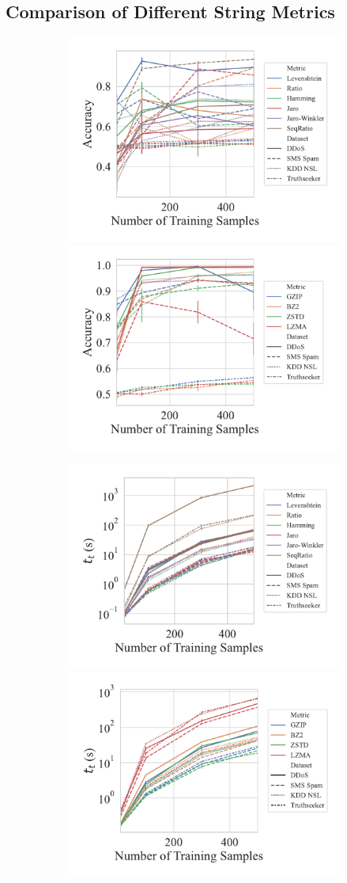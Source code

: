 \documentclass[conference]{IEEEtran}
\begin{document}
\subsection{Comparison of Different String Metrics}
\begin{figure}[htb]
    \centering
    \begin{subfigure}[htb]{\textwidth}
        \includegraphics[width=.45\textwidth]{figs/combined/string_metric_vs_accuracy.pdf}
        \includegraphics[width=.45\textwidth]{figs/combined/compressor_metric_vs_accuracy.pdf}
    \end{subfigure}
    
    \begin{subfigure}[htb]{\textwidth}
        \includegraphics[width=.45\textwidth]{figs/combined/string_metric_vs_train_time.pdf}
        \includegraphics[width=.45\textwidth]{figs/combined/compressor_metric_vs_train_time.pdf}
    \end{subfigure}
   

\end{figure}
\end{document}
